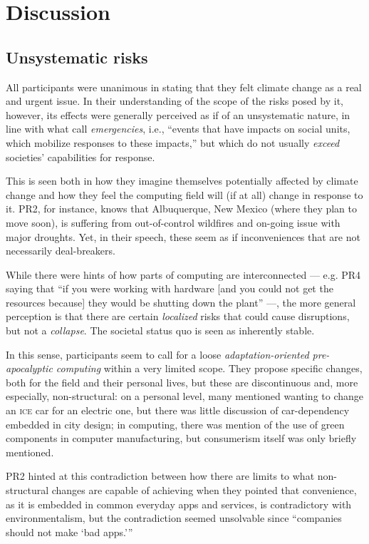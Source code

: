 \section{Discussion}

\subsection{Unsystematic risks}

All participants were unanimous in stating that they felt climate change as a real and urgent issue. In their understanding of the scope of the risks posed by it, however, its effects were generally perceived as if of an unsystematic nature, in line with what \citeauthor{silberman2010precarious} call \emph{emergencies}, i.e., ``events that have impacts on social units, which mobilize responses to these impacts,'' but which do not usually \emph{exceed} societies' capabilities for response.

This is seen both in how they imagine themselves potentially affected by climate change and how they feel the computing field will (if at all) change in response to it. PR2, for instance, knows that Albuquerque, New Mexico (where they plan to move soon), is suffering from out-of-control wildfires and on-going issue with major droughts. Yet, in their speech, these seem as if inconveniences that are not necessarily deal-breakers.

While there were hints of how parts of computing are interconnected --- e.g. PR4 saying that ``if you were working with hardware [and you could not get the resources because] they would be shutting down the plant'' ---, the more general perception is that there are certain \emph{localized} risks that could cause disruptions, but not a \emph{collapse}. The societal status quo is seen as inherently stable.

In this sense, participants seem to call for a loose \emph{adaptation-oriented pre-apocalyptic computing} within a very limited scope. They propose specific changes, both for the field and their personal lives, but these are discontinuous and, more especially, non-structural: on a personal level, many mentioned wanting to change an \textsc{ice} car for an electric one, but there was little discussion of car-dependency embedded in city design; in computing, there was mention of the use of green components in computer manufacturing, but consumerism itself was only briefly mentioned.

PR2 hinted at this contradiction between how there are limits to what non-structural changes are capable of achieving when they pointed that convenience, as it is embedded in common everyday apps and services, is contradictory with environmentalism, but the contradiction seemed unsolvable since ``companies should not make `bad apps.'\thinspace''

